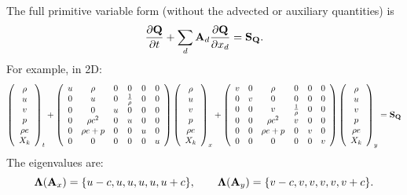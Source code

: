 The full primitive variable form (without the advected or auxiliary
quantities) is
\begin{equation}
\frac{\partial{\bf Q}}{\partial t} + \sum_d {\bf A}_d\frac{\partial{\bf Q}}{\partial x_d} = {\bf S}_{{\bf Q}}.
\end{equation}
For example, in 2D:
\begin{equation}
\left(\begin{array}{c}
\rho \\
u \\
v \\
p \\
\rho e \\
X_k
\end{array}\right)_t
+
\left(\begin{array}{cccccc}
u & \rho & 0 & 0 & 0 & 0 \\
0 & u & 0 & \frac{1}{\rho} & 0 & 0 \\
0 & 0 & u & 0 & 0 & 0 \\
0 & \rho c^2 & 0 & u & 0 & 0 \\
0 & \rho e + p & 0 & 0 & u & 0 \\
0 & 0 & 0 & 0 & 0 & u
\end{array}\right)
\left(\begin{array}{c}
\rho \\
u \\
v \\
p \\
\rho e \\
X_k
\end{array}\right)_x
+
\left(\begin{array}{cccccc}
v & 0 & \rho & 0 & 0 & 0 \\
0 & v & 0 & 0 & 0 & 0 \\
0 & 0 & v & \frac{1}{\rho} & 0 & 0 \\
0 & 0 & \rho c^2 & v & 0 & 0 \\
0 & 0 & \rho e + p & 0 & v & 0 \\
0 & 0 & 0 & 0 & 0 & v
\end{array}\right)
\left(\begin{array}{c}
\rho \\
u \\
v \\
p \\
\rho e \\
X_k
\end{array}\right)_y
=
{\bf S}_{\bf Q}
\end{equation}
The eigenvalues are:
\begin{equation}
{\bf \Lambda}({\bf A}_x) = \{u-c,u,u,u,u,u+c\}, \qquad {\bf \Lambda}({\bf A}_y) = \{v-c,v,v,v,v,v+c\} .
\end{equation}
